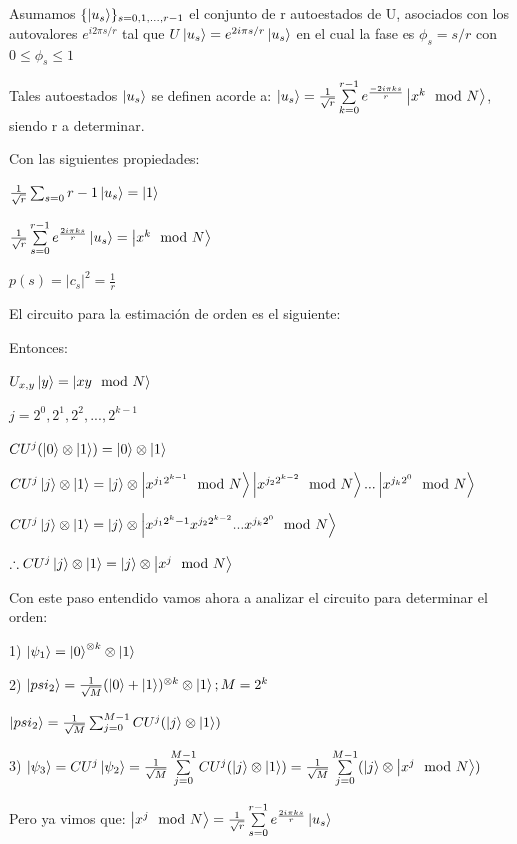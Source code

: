 Asumamos $\{ \ket{u_s}\}_{s = 0, 1, ..., r-1}$ el conjunto de r autoestados de U, asociados con los autovalores $e^{i 2 \pi s/r}$ tal que $U \ket{u_s} = e^{2 i \pi s /r} \ket{u_s}$ en el cual la fase es $\phi_s = s/r$ con $0 \leq \phi_s \leq 1$

Tales autoestados $\ket{u_s}$ se definen acorde a: $\ket{u_s} = \frac{1}{\sqrt{r}} \sum\limits_{k=0}^{r-1} e^{\frac{-2 i \pi k s}{r}} \ket{x^k \mod N}$, siendo r a determinar.

Con las siguientes propiedades:

$\frac{1}{\sqrt{r}} \sum_{s=0}{r-1} \ket{u_s} = \ket{1}$

$\frac{1}{\sqrt{r}} \sum\limits_{s=0}^{r-1} e^{\frac{2 i \pi k s}{r}} \ket{u_s} = \ket{x^k \mod N}$

$p(s) = |c_s|^2 = \frac{1}{r}$

El circuito para la estimación de orden es el siguiente:


Entonces:

$U_{x,y} \ket{y} = \ket{x y \mod N}$

$j = 2^0, 2^1, 2^2, ..., 2^{k-1}$

$CU^j (\ket{0} \otimes \ket{1}) = \ket{0} \otimes \ket{1}$

$CU^j \ket{j} \otimes \ket{1} = \ket{j} \otimes \ket{x^{j_1 2^{k-1}} \mod N} \ket{x^{j_2 2^{k-2}} \mod N} ... \ket{x^{j_k 2^0} \mod N}$

$CU^j \ket{j} \otimes \ket{1} = \ket{j} \otimes \ket{x^{j_1 2^k-1} x^{j_2 2^{k-2}} ... x^{j_k 2^0} \mod N}$

$\therefore CU^j \ket{j} \otimes \ket{1} = \ket{j} \otimes \ket{x^j \mod N}$

Con este paso entendido vamos ahora a analizar el circuito para determinar el orden:

1) $\ket{\psi_1} = \ket{0}^{\otimes k} \otimes \ket{1}$

2) $\ket{psi_2} = \frac{1}{\sqrt{M}} (\ket{0} + \ket{1})^{\otimes k} \otimes \ket{1}; M=2^k$

$\ket{psi_2} = \frac{1}{\sqrt{M}} \sum_{j=0}^{M-1} CU^j (\ket{j} \otimes \ket{1})$

3) $\ket{\psi_3} = CU^j \ket{\psi_2} = \frac{1}{\sqrt{M}} \sum\limits_{j=0}^{M-1} CU^j (\ket{j} \otimes \ket{1}) = \frac{1}{\sqrt{M}} \sum\limits_{j=0}^{M-1} (\ket{j} \otimes \ket{x^j \mod N})$

Pero ya vimos que: $\ket{x^j \mod N} = \frac{1}{\sqrt{r}} \sum\limits_{s=0}^{r-1} e^{\frac{2 i \pi k s}{r}} \ket{u_s}$

